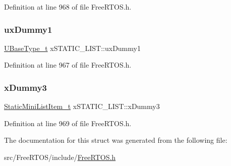 Definition at line 968 of file Free\+R\+T\+O\+S.\+h.

\mbox{\label{structx_s_t_a_t_i_c___l_i_s_t_a6d7f720dc21e3a676b885b72a945fea7}} 
\subsubsection{\texorpdfstring{ux\+Dummy1}{uxDummy1}}
{\footnotesize\ttfamily \hyperlink{portmacro_8h_a646f89d4298e4f5afd522202b11cb2e6}{U\+Base\+Type\+\_\+t} x\+S\+T\+A\+T\+I\+C\+\_\+\+L\+I\+S\+T\+::ux\+Dummy1}



Definition at line 967 of file Free\+R\+T\+O\+S.\+h.

\mbox{\label{structx_s_t_a_t_i_c___l_i_s_t_a232545ebb5629617e0ee6ba286e37788}} 
\subsubsection{\texorpdfstring{x\+Dummy3}{xDummy3}}
{\footnotesize\ttfamily \hyperlink{_free_r_t_o_s_8h_a9097f48f4dfa56e8e01d9179462c7994}{Static\+Mini\+List\+Item\+\_\+t} x\+S\+T\+A\+T\+I\+C\+\_\+\+L\+I\+S\+T\+::x\+Dummy3}



Definition at line 969 of file Free\+R\+T\+O\+S.\+h.



The documentation for this struct was generated from the following file\+:\begin{DoxyCompactItemize}
\item 
src/\+Free\+R\+T\+O\+S/include/\hyperlink{_free_r_t_o_s_8h}{Free\+R\+T\+O\+S.\+h}\end{DoxyCompactItemize}
